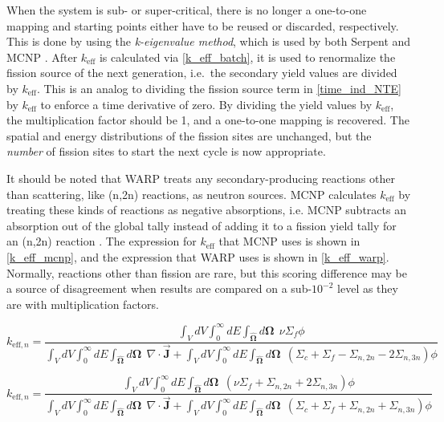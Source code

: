 When the system is sub- or super-critical, there is no longer a one-to-one mapping and starting points either have to be reused or discarded, respectively.  This is done by using the \emph{k-eigenvalue method}, which is used by both Serpent and MCNP \cite{jaakko,mcnp}.%
 After $k_\mathrm{eff}$ is calculated via \eqref{k_eff_batch}, it is used to renormalize the fission source of the next generation, i.e.\ the secondary yield values are divided by $k_\mathrm{eff}$.  This is an analog to dividing the fission source term in \eqref{time_ind_NTE} by $k_\mathrm{eff}$ to enforce a time derivative of zero.  By dividing the yield values by $k_\mathrm{eff}$, the multiplication factor should be 1, and a one-to-one mapping is recovered.  The spatial and energy distributions of the fission sites are unchanged, but the \emph{number} of fission sites to start the next cycle is now appropriate.
 
It should be noted that WARP treats any secondary-producing reactions other than scattering, like (n,2n) reactions, as neutron sources.  MCNP calculates $k_\mathrm{eff}$ by treating these kinds of reactions as negative absorptions, i.e. MCNP subtracts an absorption out of the global tally instead of adding it to a fission yield tally for an (n,2n) reaction \cite{mcnp}.  The expression for $k_\mathrm{eff}$ that MCNP uses is shown in \eqref{k_eff_mcnp}, and the expression that WARP uses is shown in \eqref{k_eff_warp}.  Normally, reactions other than fission are rare, but this scoring difference may be a source of disagreement when results are compared on a sub-$10^{-2}$ level as they are with multiplication factors.

\begin{equation}
\label{k_eff_mcnp}
k_{\mathrm{eff},n} = \frac{ \int_{V} dV \int_0^\infty dE \int_{\boldsymbol{\hat{\Omega}}} d\boldsymbol{\Omega} \:\: \nu \Sigma_f \phi}{\int_{V} dV \int_0^\infty dE \int_{\boldsymbol{\hat{\Omega}}} d\boldsymbol{\Omega} \:\: \nabla \cdot \boldsymbol{\vec{J}}  + \int_{V} dV \int_0^\infty dE \int_{\boldsymbol{\hat{\Omega}}} d\boldsymbol{\Omega} \:\: (\Sigma_c + \Sigma_f - \Sigma_{n,2n} - 2\Sigma_{n,3n}) \phi}
\end{equation}

\begin{equation}
\label{k_eff_warp}
k_{\mathrm{eff},n} = \frac{ \int_{V} dV \int_0^\infty dE \int_{\boldsymbol{\hat{\Omega}}} d\boldsymbol{\Omega} \:\: (\nu \Sigma_f + \Sigma_{n,2n} + 2\Sigma_{n,3n})\phi}{\int_{V} dV \int_0^\infty dE \int_{\boldsymbol{\hat{\Omega}}} d\boldsymbol{\Omega} \:\: \nabla \cdot \boldsymbol{\vec{J}}  + \int_{V} dV \int_0^\infty dE \int_{\boldsymbol{\hat{\Omega}}} d\boldsymbol{\Omega} \:\: (\Sigma_c + \Sigma_f + \Sigma_{n,2n} + \Sigma_{n,3n}) \phi}
\end{equation}


